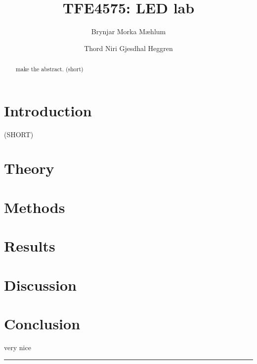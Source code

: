 \documentclass[5p,sort&compress]{elsarticle}
\begin{document}
\begin{frontmatter}

  \title{TFE4575: LED lab}

  \author[fysikk]{Brynjar Morka Mæhlum}
  \author[fysikk]{Thord Niri Gjesdhal Heggren}
  \address[fysikk]{Department of Physics, Norwegian University of Science and Technology, 7491 Trondheim, Norway.}

  \begin{abstract}

    \noindent make the abstract. (short)

  \end{abstract}


\end{frontmatter}

{ %
\hypersetup{linkcolor=purple}

\tableofcontents


\section{Introduction}
\label{intro}
(SHORT)



\section{Theory}
\label{theory}



\section{Methods}
\label{methods}




\section{Results}
\label{results}


\section{Discussion}
\label{discussion}



\section{Conclusion}
\label{conclusion}

\noindent very nice \cite{referanse_test}

}
\begingroup
\begin{center}
  \rule{2cm}{.4pt}
\end{center}
\makeatletter
{}
\makeatother



\endgroup
\end{document}
